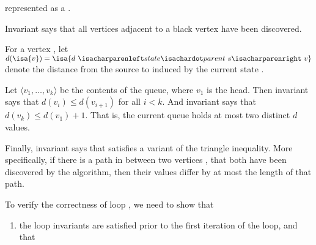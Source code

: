 \begin{isabellebody}
\begin{isamarkuptext}
represented as a .%
\end{isamarkuptext}\isamarkuptrue%
%
\begin{isamarkuptext}%
Invariant  says that all vertices adjacent to a black
vertex have been discovered.%
\end{isamarkuptext}\isamarkuptrue%
%
\begin{isamarkuptext}%
For a vertex , let $d(\isa{v})=\isa{d\ {\isacharparenleft}{\kern0pt}state{\isachardot}{\kern0pt}parent\ s{\isacharparenright}{\kern0pt}\ v}$ denote the distance from the
source  to  induced by the current state .%
\end{isamarkuptext}\isamarkuptrue%
%
\begin{isamarkuptext}%
Let $\langle v_1,\dots,v_k\rangle$ be the contents of the queue, where $v_1$ is the head. Then
invariant  says that $d(v_i)\leq d(v_{i+1})$ for all $i<k$. And
invariant  says that $d(v_k)\leq d(v_1)+1$. That is, the current
queue holds at most two distinct $d$ values.%
\end{isamarkuptext}\isamarkuptrue%
%
\begin{isamarkuptext}%
Finally, invariant  says that  satisfies a variant of
the triangle inequality. More specifically, if there is a path in  between two vertices
,  that both have been discovered by the algorithm, then their  values
differ by at most the length of that path.%
\end{isamarkuptext}\isamarkuptrue%
%
\begin{isamarkuptext}%
To verify the correctness of loop , we need to show that

%
\begin{enumerate}%
\item the loop invariants are satisfied prior to the first iteration of the loop, and that


\end{enumerate}
\end{isamarkuptext}
\end{isabellebody}
